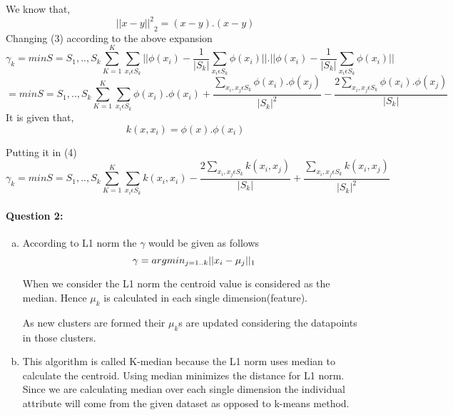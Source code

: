 \documentclass[letterpaper,11pt]{article}
\begin{document}
\begin{enumerate}[(a)]
We know that,
\[
	{{||x-y||}^2}_2 = (x-y).(x-y)
\]
Changing (3) according to the above expansion
\[
	{\gamma}_k = min S={S_1,..,S_k}\sum\limits_{K=1}^K\sum\limits_{x_i{\epsilon}S_k} {{||{\phi}(x_i) - \frac{1}{|S_k|}\sum_{x_i{\epsilon}S_k}{\phi}(x_i)||}}.{{||{\phi}(x_i) - \frac{1}{|S_k|}\sum_{x_i{\epsilon}S_k}{\phi}(x_i)||}}
\]
\[
	 = min S={S_1,..,S_k}\sum\limits_{K=1}^K\sum\limits_{x_i{\epsilon}S_k} {{\phi}(x_i).{\phi}(x_i)} + \frac{\sum_{x_i,x_j{\epsilon}S_k}{{\phi}(x_i)}.{{\phi}(x_j)}}{|S_k|^2} -\frac{2\sum_{x_i,x_j{\epsilon}S_k}{{\phi}(x_i)}.{{\phi}(x_j)}}{|S_k|}  \tag{4}
\]
It is given that,
\[
	k(x,x_i) = {\phi}(x).{\phi}(x_i)
\]

Putting it in (4)
\[
	{\gamma}_k =min S={S_1,..,S_k}\sum\limits_{K=1}^K\sum\limits_{x_i{\epsilon}S_k} k(x_i,x_i) -\frac{2\sum_{x_i,x_j{\epsilon}S_k}k(x_i,x_j)}{|S_k|} + \frac{\sum_{x_i,x_j{\epsilon}S_k}k(x_i,x_j)}{|S_k|^2}
\]

\end{enumerate}

\paragraph{Question 2:} 
\begin{enumerate}[(a)]
\item

According to L1 norm the $\gamma$ would be given as follows
\[
	\gamma = arg \space min_{j=1 .. k} || x_i - \mu_j ||_1 
\]



When we consider the L1 norm the centroid value is considered as the median. Hence $\mu_k$ is calculated in each single dimension(feature).

As new clusters are formed their $\mu_k$s are updated considering the datapoints in those clusters.
	
\item
This algorithm is called K-median because the L1 norm uses median to calculate the centroid. Using median minimizes the distance for L1 norm. Since we are calculating median over each single dimension the individual attribute will come from the given dataset as opposed to k-means method.
	
\end{enumerate}
\end{document}
